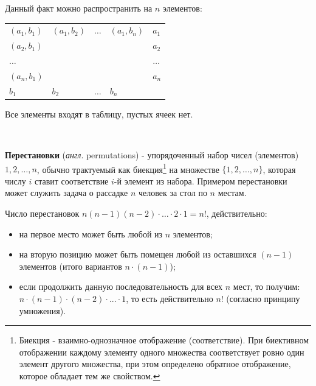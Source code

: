 Данный факт можно распространить на $n$ элементов:
\begin{table}[h]
	\begin{tabular}{lllll}
		\cline{1-4}
		\multicolumn{1}{|l|}{$(a_1,b_1)$}  & \multicolumn{1}{l|}{$(a_1,b_2)$} & \multicolumn{1}{l|}{$\dots$} & \multicolumn{1}{l|}{$(a_1,b_n)$} & $a_1$   \\ \cline{1-4}
		\multicolumn{1}{|l|}{$(a_2, b_1)$} & \multicolumn{1}{l|}{}            & \multicolumn{1}{l|}{}        & \multicolumn{1}{l|}{}            & $a_2$   \\ \cline{1-4}
		\multicolumn{1}{|l|}{$\dots$}      & \multicolumn{1}{l|}{}            & \multicolumn{1}{l|}{}        & \multicolumn{1}{l|}{}            & $\dots$ \\ \cline{1-4}
		\multicolumn{1}{|l|}{$(a_n,b_1)$}  & \multicolumn{1}{l|}{}            & \multicolumn{1}{l|}{}        & \multicolumn{1}{l|}{}            & $a_n$   \\ \cline{1-4}
		$b_1$                              & $b_2$                            & $\dots$                      & $b_n$                            &        
	\end{tabular}
\end{table}

\begin{remark}
	Все элементы входят в таблицу, пустых ячеек нет.
\end{remark}

~

\textbf{Перестановки} (\textit{англ}. permutations) - упорядоченный набор чисел (элементов) $1,2,\dots,n$, обычно трактуемый как биекция\footnote{Биекция - взаимно-однозначное отображение (соответствие). При биективном отображении каждому элементу одного множества соответствует ровно один элемент другого множества, при этом определено обратное отображение, которое обладает тем же свойством.} на множестве $\{ 1,2,\dots,n \}$, которая числу $i$ ставит соответствие $i$-й элемент из набора.
Примером перестановки может служить задача о рассадке $n$ человек за стол по $n$ местам.

Число перестановок $n(n-1)(n-2) \cdot \dots \cdot 2 \cdot 1 = n!$, действительно:
\begin{itemize}
	\item на первое место может быть любой из $n$ элементов;
	\item на вторую позицию может быть помещен любой из оставшихся $(n-1)$ элементов (итого вариантов $n \cdot (n-1)$);
	\item если продолжить данную последовательность для всех $n$ мест, то получим: $n \cdot (n-1) \cdot (n-2) \cdot ... \cdot 1$, то есть действительно $n!$ (согласно принципу умножения).
\end{itemize}

